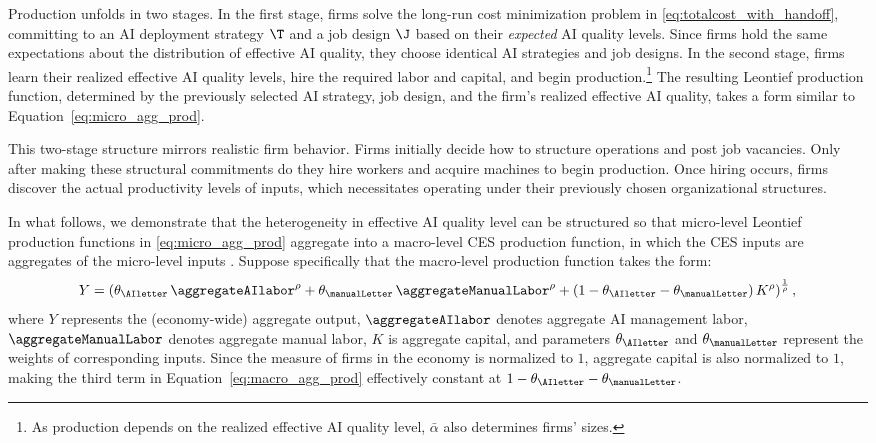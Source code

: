 Production unfolds in two stages.
In the first stage, firms solve the long-run cost minimization problem in \eqref{eq:totalcost_with_handoff}, committing to an AI deployment strategy $\T$ and a job design $\J$ based on their \emph{expected} AI quality levels.
Since firms hold the same expectations about the distribution of effective AI quality, they choose identical AI strategies and job designs.
In the second stage, firms learn their realized effective AI quality levels, hire the required labor and capital, and begin production.\footnote{As production depends on the realized effective AI quality level, $\bar{\alpha}$ also determines firms' sizes.}
The resulting Leontief production function, determined by the previously selected AI strategy, job design, and the firm's realized effective AI quality, takes a form similar to Equation~\eqref{eq:micro_agg_prod}.

This two-stage structure mirrors realistic firm behavior.
Firms initially decide how to structure operations and post job vacancies.
Only after making these structural commitments do they hire workers and acquire machines to begin production.
Once hiring occurs, firms discover the actual productivity levels of inputs, which necessitates operating under their previously chosen organizational structures.

In what follows, we demonstrate that the heterogeneity in effective AI quality level can be structured so that micro-level Leontief production functions in \eqref{eq:micro_agg_prod} aggregate into a macro-level CES production function, in which the CES inputs are aggregates of the micro-level inputs \citep{levhari1968note}.
Suppose specifically that the macro-level production function takes the form:
\begin{equation}
Y = \left(\theta_{\AIletter}\,\aggregateAIlabor^{\rho}+\theta_{\manualLetter}\,\aggregateManualLabor^{\rho}+(1-\theta_{\AIletter}-\theta_{\manualLetter})\,K^\rho\right)^{\frac{1}{\rho}},\label{eq:macro_agg_prod}
\end{equation}
where $Y$ represents the (economy-wide) aggregate output, $\aggregateAIlabor$ denotes aggregate AI management labor, $\aggregateManualLabor$ denotes aggregate manual labor, $K$ is aggregate capital, and parameters $\theta_{\AIletter}$ and $\theta_{\manualLetter}$ represent the weights of corresponding inputs.
Since the measure of firms in the economy is normalized to $1$, aggregate capital is also normalized to $1$, making the third term in Equation~\eqref{eq:macro_agg_prod} effectively constant at $1-\theta_{\AIletter}-\theta_{\manualLetter}$.

